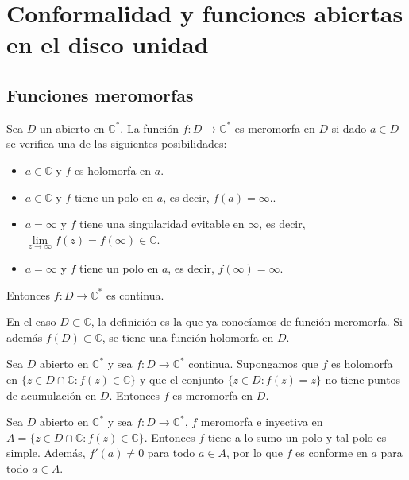 \chapter{Conformalidad y funciones abiertas en el disco unidad}
\section{Funciones meromorfas}

\begin{definition}
    Sea $D$ un abierto en $\mathbb{C}^\ast$.
    La función $f: D \to \mathbb{C}^\ast$ es meromorfa en $D$ si dado $a \in D$ se verifica una de las siguientes posibilidades:
    \begin{itemize}
        \item $a \in \mathbb{C}$ y $f$ es holomorfa en $a$.
        \item $a \in \mathbb{C}$ y $f$ tiene un polo en $a$, es decir, $f(a) = \infty$..
        \item $a = \infty$ y $f$ tiene una singularidad evitable en $\infty$, es decir, $\lim\limits_{z \to \infty} f(z) = f(\infty) \in \mathbb{C}$.
        \item $a = \infty$ y $f$ tiene un polo en $a$, es decir, $f(\infty) = \infty$.
    \end{itemize}

    Entonces $f: D \to \mathbb{C}^\ast$ es continua.
\end{definition}

\begin{remark}
    En el caso $D \subset \mathbb{C}$, la definición es la que ya conocíamos de función meromorfa.
    Si además $f(D) \subset \mathbb{C}$, se tiene una función holomorfa en $D$.
\end{remark}

\begin{remark}
    Sea $D$ abierto en $\mathbb{C}^\ast$ y sea $f: D \to \mathbb{C}^\ast$ continua.
    Supongamos que $f$ es holomorfa en $\{z \in D \cap \mathbb{C} : f(z) \in \mathbb{C}\}$ y que el conjunto $\{z \in D : f(z) = z\}$ no tiene puntos de acumulación en $D$.
    Entonces $f$ es meromorfa en $D$.
\end{remark}

\begin{remark}
    Sea $D$ abierto en $\mathbb{C}^\ast$ y sea $f: D \to \mathbb{C}^\ast$, $f$ meromorfa e inyectiva en $ A = \{z \in D \cap \mathbb{C} : f(z) \in \mathbb{C}\}$.
    Entonces $f$ tiene a lo sumo un polo y tal polo es simple.
    Además, $f'(a) \neq 0$ para todo $a \in A$, por lo que $f$ es conforme en $a$ para todo $a \in A$.
\end{remark}

